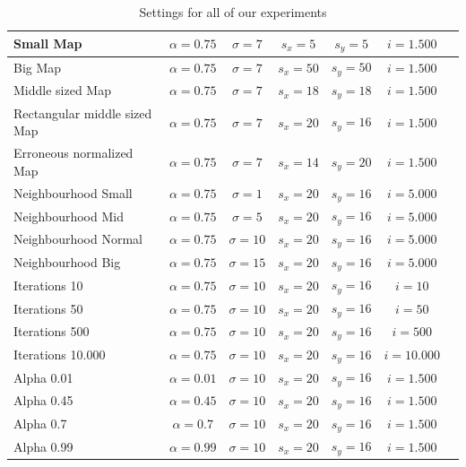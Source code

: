 \documentclass{acm_proc_article-sp}
\begin{document}
\begin{table}
\centering
\begin{tabular}{|l|c|c|c|c|c|c|}
    \hline
    Small Map & $\alpha = 0.75$ & $\sigma = 7$ & $s_x=5$ & $s_y=5$ & $i=1.500$ \\
    \hline
    Big Map & $\alpha = 0.75$ & $\sigma = 7$ & $s_x=50$ & $s_y=50$ & $i=1.500$ \\
    \hline
    Middle sized Map & $\alpha = 0.75$ & $\sigma = 7$ & $s_x=18$ & $s_y=18$ & $i=1.500$ \\
    \hline
    Rectangular middle sized Map & $\alpha = 0.75$ & $\sigma = 7$ & $s_x=20$ & $s_y=16$ & $i=1.500$ \\
    \hline
    Erroneous normalized Map & $\alpha = 0.75$ & $\sigma = 7$ & $s_x=14$ & $s_y=20$ & $i=1.500$ \\
    \hline
    Neighbourhood Small & $\alpha = 0.75$ & $\sigma = 1$ & $s_x=20$ & $s_y=16$ & $i=5.000$ \\
    \hline
    Neighbourhood Mid & $\alpha = 0.75$ & $\sigma = 5$ & $s_x=20$ & $s_y=16$ & $i=5.000$ \\
    \hline
    Neighbourhood Normal & $\alpha = 0.75$ & $\sigma = 10$ & $s_x=20$ & $s_y=16$ & $i=5.000$ \\
    \hline
    Neighbourhood Big & $\alpha = 0.75$ & $\sigma = 15$ & $s_x=20$ & $s_y=16$ & $i=5.000$ \\
    \hline
    Iterations 10 & $\alpha = 0.75$ & $\sigma = 10$ & $s_x=20$ & $s_y=16$ & $i=10$ \\
    \hline
    Iterations 50 & $\alpha = 0.75$ & $\sigma = 10$ & $s_x=20$ & $s_y=16$ & $i=50$ \\
    \hline
    Iterations 500 & $\alpha = 0.75$ & $\sigma = 10$ & $s_x=20$ & $s_y=16$ & $i=500$ \\
    \hline
    Iterations 10.000 & $\alpha = 0.75$ & $\sigma = 10$ & $s_x=20$ & $s_y=16$ & $i=10.000$ \\
    \hline
    Alpha 0.01 & $\alpha = 0.01$ & $\sigma = 10$ & $s_x=20$ & $s_y=16$ & $i=1.500$ \\
    \hline
    Alpha 0.45 & $\alpha = 0.45$ & $\sigma = 10$ & $s_x=20$ & $s_y=16$ & $i=1.500$ \\
    \hline
    Alpha 0.7 & $\alpha = 0.7$ & $\sigma = 10$ & $s_x=20$ & $s_y=16$ & $i=1.500$ \\
    \hline
    Alpha 0.99 & $\alpha = 0.99$ & $\sigma = 10$ & $s_x=20$ & $s_y=16$ & $i=1.500$ \\
    \hline
\end{tabular}
\caption{Settings for all of our experiments}
\label{tab:settings}
\end{table}
\end{document}

